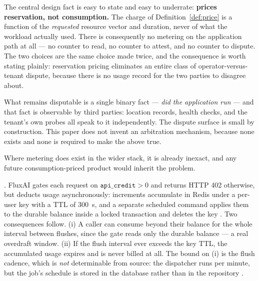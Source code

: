 The central design fact is easy to state and easy to underrate: \textbf{\Flux prices reservation, not
consumption.} The charge of Definition~\ref{def:price} is a function of the \emph{requested} resource
vector and duration, never of what the workload actually used. There is consequently no metering on
the application path at all --- no counter to read, no counter to attest, and no counter to dispute.
 The two choices are the same choice made twice, and the
consequence is worth stating plainly: reservation pricing eliminates an entire class of
operator-versus-tenant dispute, because there is no usage record for the two parties to disagree
about.

What remains disputable is a single binary fact --- \emph{did the application run} --- and that fact
is observable by third parties: \FluxOS location records, \FDM health checks, and the tenant's own
probes all speak to it independently. The dispute surface is small by construction. This paper does
not invent an arbitration mechanism, because none exists and none is required to make the above true.

Where metering does exist in the wider stack, it is already inexact, and any future
consumption-priced product would inherit the problem.

\begin{property}
\label{prop:overdraft}
\shipped. FluxAI gates each request on $\texttt{api\_credit} > 0$ and returns HTTP 402 otherwise, but
deducts usage asynchronously: increments accumulate in Redis under a per-user key with a TTL of
\qty{300}{\second}, and a separate scheduled command applies them to the durable balance inside a
locked transaction and deletes the key
.
Two consequences follow. (i) A caller can consume beyond their balance for the whole interval between
flushes, since the gate reads only the durable balance --- a real overdraft window. (ii) If the flush
interval ever exceeds the key TTL, the accumulated usage expires and is never billed at all. The
bound on (i) is the flush cadence, which is \emph{not} determinable from source: the dispatcher runs
per minute, but the job's schedule is stored in the database rather than in the repository
.
\end{property}

